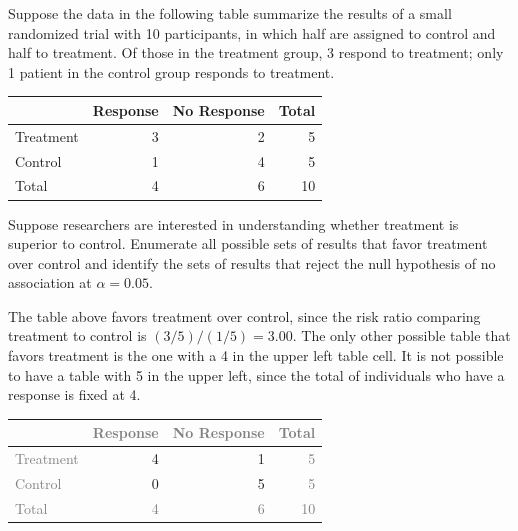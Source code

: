 \begin{examplewrap}
	\begin{nexample}{Suppose the data in the following table summarize the results of a small randomized trial with 10 participants, in which half are assigned to control and half to treatment. Of those in the treatment group, 3 respond to treatment; only 1 patient in the control group responds to treatment.
			\vspace{0.2cm}

			\centering
			\begin{tabular}{l rr |r}
				\hline
				 & Response & No Response & Total \\
				\hline
				Treatment &  3 & 2 & 5    \\
				Control & 1 & 4 &  5    \\
				\hline
				Total & 4 & 6 & 10 \\
				\hline
			\end{tabular}
			\flushleft

			\vspace{0.1cm}

			Suppose researchers are interested in understanding whether treatment is superior to control. Enumerate all possible sets of results that favor treatment over control and identify the sets of results that reject the null hypothesis of no association at $\alpha = 0.05$.}\label{ex:fisherTestSmallSample}

		The table above favors treatment over control, since the risk ratio comparing treatment to control is $(3/5)/(1/5) = 3.00$. The only other possible table that favors treatment is the one with a 4 in the upper left table cell. It is not possible to have a table with 5 in the upper left, since the total of individuals who have a response is fixed at 4.

		\centering
		\begin{tabular}{l rr |r}
			\hline
			& \textcolor{gray}{Response} & \textcolor{gray}{No Response} & \textcolor{gray}{Total} \\
			\hline
			\textcolor{gray}{Treatment} &  4 & 1 & \textcolor{gray}{5}    \\
			\textcolor{gray}{Control} & 0 & 5 &  \textcolor{gray}{5}    \\
			\hline
			\textcolor{gray}{Total} & \textcolor{gray}{4} & \textcolor{gray}{6} & \textcolor{gray}{10} \\
			\hline
		\end{tabular}
		\flushleft


\end{nexample}
\end{examplewrap}
